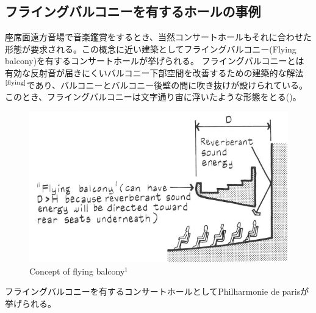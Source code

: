 \pagebreak
\subsection{フライングバルコニーを有するホールの事例}
座席面遠方音場で音楽鑑賞をするとき、当然コンサートホールもそれに合わせた形態が要求される。この概念に近い建築としてフライングバルコニー(Flying balcony)を有するコンサートホールが挙げられる。
フライングバルコニーとは有効な反射音が届きにくいバルコニー下部空間を改善するための建築的な解法$^{\text{\cite{flying}}}$であり、バルコニーとバルコニー後壁の間に吹き抜けが設けられている。このとき、フライングバルコニーは文字通り宙に浮いたような形態をとる()。
\begin{figure}[htbp]
    \centering
    \includegraphics[keepaspectratio,scale=1]{01_att/flyingbalcony.pdf}
    \caption{\hspace{1mm}Concept of flying balcony$^1$}
    \label{fig:flyigbalcony}
\end{figure}
フライングバルコニーを有するコンサートホールとしてPhilharmonie de parisが挙げられる。


\addtocounter{footnote}{1}
\addtocounter{footnote}{1}

\pagebreak
